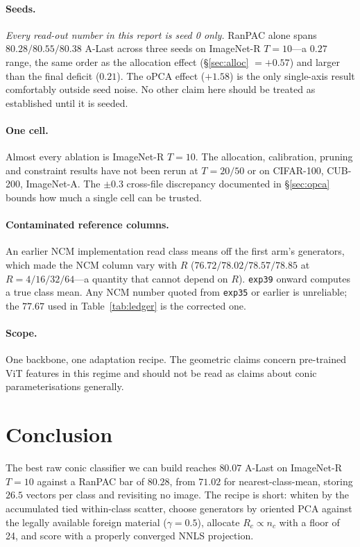 \documentclass[10pt,twocolumn]{article}
\begin{document}
\paragraph{Seeds.} \emph{Every read-out number in this report is seed 0 only.}
RanPAC alone spans $80.28/80.55/80.38$ A-Last across three seeds on ImageNet-R
$T{=}10$---a $0.27$ range, the same order as the allocation effect
(\S\ref{sec:alloc} $=+0.57$) and larger than the final deficit ($0.21$). The
oPCA effect ($+1.58$) is the only single-axis result comfortably outside seed
noise. No other claim here should be treated as established until it is seeded.

\paragraph{One cell.} Almost every ablation is ImageNet-R $T{=}10$. The
allocation, calibration, pruning and constraint results have not been rerun at
$T{=}20/50$ or on CIFAR-100, CUB-200, ImageNet-A. The $\pm0.3$ cross-file
discrepancy documented in \S\ref{sec:opca} bounds how much a single cell can be
trusted.

\paragraph{Contaminated reference columns.} An earlier NCM implementation read
class means off the first arm's generators, which made the NCM column vary with
$R$ ($76.72/78.02/78.57/78.85$ at $R{=}4/16/32/64$---a quantity that cannot
depend on $R$). \texttt{exp39} onward computes a true class mean. Any NCM
number quoted from \texttt{exp35} or earlier is unreliable; the $77.67$ used in
Table~\ref{tab:ledger} is the corrected one.

\paragraph{Scope.} One backbone, one adaptation recipe. The geometric claims
concern pre-trained ViT features in this regime and should not be read as claims
about conic parameterisations generally.

\section{Conclusion}

The best raw conic classifier we can build reaches $80.07$ A-Last on
ImageNet-R $T{=}10$ against a RanPAC bar of $80.28$, from $71.02$ for
nearest-class-mean, storing $26.5$ vectors per class and revisiting no image.
The recipe is short: whiten by the accumulated tied within-class scatter, choose
generators by oriented PCA against the legally available foreign material
($\gamma{=}0.5$), allocate $R_c\propto n_c$ with a floor of 24, and score with a
properly converged NNLS projection.
\end{document}
